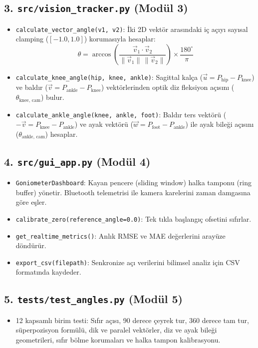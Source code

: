 \documentclass[11pt, a4paper]{article}
\begin{document}
\subsection{3. \texttt{src/vision\_tracker.py} (Modül 3)}
\begin{itemize}[leftmargin=1.5em]
    \item \texttt{calculate\_vector\_angle(v1, v2)}: İki 2D vektör arasındaki iç açıyı sayısal clamping ($[-1.0, 1.0]$) korumasıyla hesaplar:
    $$\theta = \arccos\left(\frac{\vec{v}_1 \cdot \vec{v}_2}{\|\vec{v}_1\| \, \|\vec{v}_2\|}\right) \times \frac{180^\circ}{\pi}$$
    \item \texttt{calculate\_knee\_angle(hip, knee, ankle)}: Sagittal kalça ($\vec{u} = P_{\text{hip}} - P_{\text{knee}}$) ve baldır ($\vec{v} = P_{\text{ankle}} - P_{\text{knee}}$) vektörlerinden optik diz fleksiyon açısını ($\theta_{\text{knee, cam}}$) bulur.
    \item \texttt{calculate\_ankle\_angle(knee, ankle, foot)}: Baldır ters vektörü ($-\vec{v} = P_{\text{knee}} - P_{\text{ankle}}$) ve ayak vektörü ($\vec{w} = P_{\text{foot}} - P_{\text{ankle}}$) ile ayak bileği açısını ($\theta_{\text{ankle, cam}}$) hesaplar.
\end{itemize}

\subsection{4. \texttt{src/gui\_app.py} (Modül 4)}
\begin{itemize}[leftmargin=1.5em]
    \item \texttt{GoniometerDashboard}: Kayan pencere (sliding window) halka tamponu (ring buffer) yönetir. Bluetooth telemetrisi ile kamera karelerini zaman damgasına göre eşler.
    \item \texttt{calibrate\_zero(reference\_angle=0.0)}: Tek tıkla başlangıç ofsetini sıfırlar.
    \item \texttt{get\_realtime\_metrics()}: Anlık RMSE ve MAE değerlerini arayüze döndürür.
    \item \texttt{export\_csv(filepath)}: Senkronize açı verilerini bilimsel analiz için CSV formatında kaydeder.
\end{itemize}

\subsection{5. \texttt{tests/test\_angles.py} (Modül 5)}
\begin{itemize}[leftmargin=1.5em]
    \item 12 kapsamlı birim testi: Sıfır açısı, 90 derece çeyrek tur, 360 derece tam tur, süperpozisyon formülü, dik ve paralel vektörler, diz ve ayak bileği geometrileri, sıfır bölme korumaları ve halka tampon kalibrasyonu.
\end{itemize}
\end{document}

